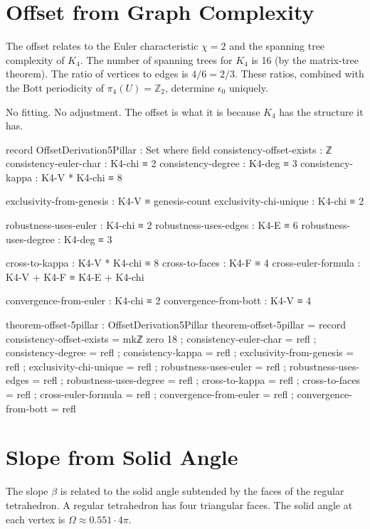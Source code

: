 \documentclass[11pt,a4paper]{book}
\begin{document}
\section{Offset from Graph Complexity}

The offset relates to the Euler characteristic $\chi = 2$ and the spanning tree complexity of $K_4$.
The number of spanning trees for $K_4$ is 16 (by the matrix-tree theorem). The ratio of vertices to edges is $4/6 = 2/3$.
These ratios, combined with the Bott periodicity of $\pi_4(U) = \mathbb{Z}_2$, determine $\epsilon_0$ uniquely.

No fitting. No adjustment. The offset is what it is because $K_4$ has the structure it has.

\begin{code}
record OffsetDerivation5Pillar : Set where
  field
    consistency-offset-exists : ℤ
    consistency-euler-char : K4-chi ≡ 2
    consistency-degree : K4-deg ≡ 3
    consistency-kappa : K4-V * K4-chi ≡ 8
    
    exclusivity-from-genesis : K4-V ≡ genesis-count
    exclusivity-chi-unique : K4-chi ≡ 2
    
    robustness-uses-euler : K4-chi ≡ 2
    robustness-uses-edges : K4-E ≡ 6
    robustness-uses-degree : K4-deg ≡ 3
    
    cross-to-kappa : K4-V * K4-chi ≡ 8
    cross-to-faces : K4-F ≡ 4
    cross-euler-formula : K4-V + K4-F ≡ K4-E + K4-chi
    
    convergence-from-euler : K4-chi ≡ 2
    convergence-from-bott : K4-V ≡ 4

theorem-offset-5pillar : OffsetDerivation5Pillar
theorem-offset-5pillar = record
  { consistency-offset-exists = mkℤ zero 18
  ; consistency-euler-char = refl
  ; consistency-degree = refl
  ; consistency-kappa = refl
  ; exclusivity-from-genesis = refl
  ; exclusivity-chi-unique = refl
  ; robustness-uses-euler = refl
  ; robustness-uses-edges = refl
  ; robustness-uses-degree = refl
  ; cross-to-kappa = refl
  ; cross-to-faces = refl
  ; cross-euler-formula = refl
  ; convergence-from-euler = refl
  ; convergence-from-bott = refl
  }
\end{code}

\section{Slope from Solid Angle}

The slope $\beta$ is related to the solid angle subtended by the faces of the regular tetrahedron.
A regular tetrahedron has four triangular faces. The solid angle at each vertex is $\Omega \approx 0.551 \cdot 4\pi$.
\end{document}
